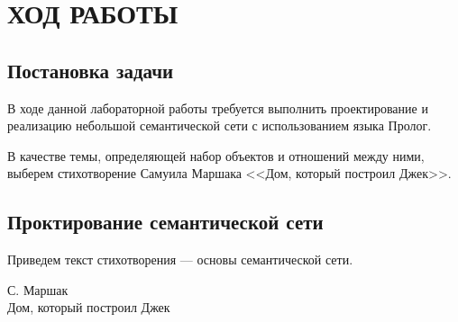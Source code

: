 \section{ХОД РАБОТЫ}

\subsection{Постановка задачи}

В ходе данной лабораторной работы требуется выполнить проектирование
и реализацию небольшой семантической сети с использованием языка Пролог.

В качестве темы, определяющей набор объектов и отношений между ними,
выберем стихотворение Самуила Маршака <<Дом, который построил Джек>>.

\subsection{Проктирование семантической сети}

Приведем текст стихотворения --- основы семантической сети.

\begin{center}
С. Маршак \\
Дом, который построил Джек
\end{center}

